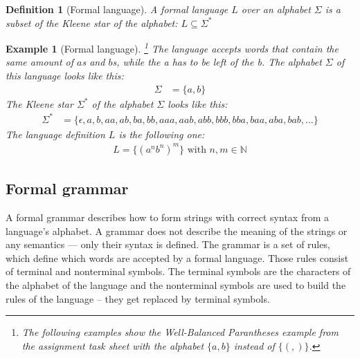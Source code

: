 \documentclass[a4paper, 11pt]{article}
\newtheorem*{example*}{Example}
\newtheorem*{definition*}{Definition}
\begin{document}
\begin{definition*}[Formal language]
A formal language $L$ over an alphabet $\Sigma$ is a subset of the Kleene star of the alphabet: $L \subseteq \Sigma^*$
\end{definition*}


\begin{example*}[Formal language]\footnote{The following examples show the \textit{Well-Balanced Parantheses} example from the assignment task sheet with the alphabet $\{a, b\}$ instead of $\{(, )\}$. } The language accepts words that contain the same amount of $a$s and $b$s, while the a has to be left of the b. 
The alphabet $\Sigma$ of this language looks like this:
\begin{align*}
\Sigma & = \{ a, b\}
\end{align*}
The Kleene star $\Sigma^*$ of the alphabet $\Sigma$ looks like this:
\begin{align*}
\Sigma^* & = \{ \epsilon, a, b, aa, ab, ba, bb, aaa, aab, abb, bbb, bba, baa, aba, bab, ...   \}
\end{align*}
The language definition $L$ is the following one:
\begin{align*}
L = \{ (a^{n}b^{n})^m \} \text{ with } n, m \in \mathbb{N}
\end{align*}

\end{example*}




\subsection{Formal grammar}
\label{formalgrammar}


A formal grammar describes how to form strings with correct syntax from a language's alphabet. A grammar does not describe the meaning of the strings or any semantics — only their syntax is defined. The grammar is a set of rules, which define which words are accepted by a formal language. Those rules consist of terminal and nonterminal symbols. The terminal symbols are the characters of the alphabet of the language and the nonterminal symbols are used to build the rules of the language -- they get replaced by terminal symbols. \cite{CNF, language} 
\end{document}
